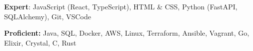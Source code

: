  \textbf{Expert}: JavaScript (React, TypeScript), HTML \& CSS, Python (FastAPI, SQLAlchemy), Git, VSCode

 \textbf{Proficient:} Java, SQL, Docker, AWS, Linux, Terraform, Ansible, Vagrant, Go, Elixir, Crystal, C, Rust
